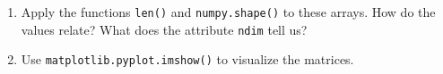 \begin{enumerate}
\begin{enumerate}
$$\begin{array}{rrrrrr}
    4 &  3& 4 & 3&4&3\\   
    2 &  1& 2 & 1&2&1
    \end{array}\right) \nonumber
    $$
     \item  Example matrix 
    $$
    \left(\begin{array}{rrr}                                
    1  &6 &11\\                                               
    2  &7 &12\\                                              
    3  &8 &13\\   
    4  &9 &14\\
    5& 10 &15
    \end{array}\right) \nonumber
    $$
 \end{enumerate}   
\item Apply the functions \verb|len()| and \verb|numpy.shape()| to these arrays. How do the values relate? What does the attribute \verb|ndim| tell us?

\item Use \verb|matplotlib.pyplot.imshow()| to visualize the matrices.
\end{enumerate}
